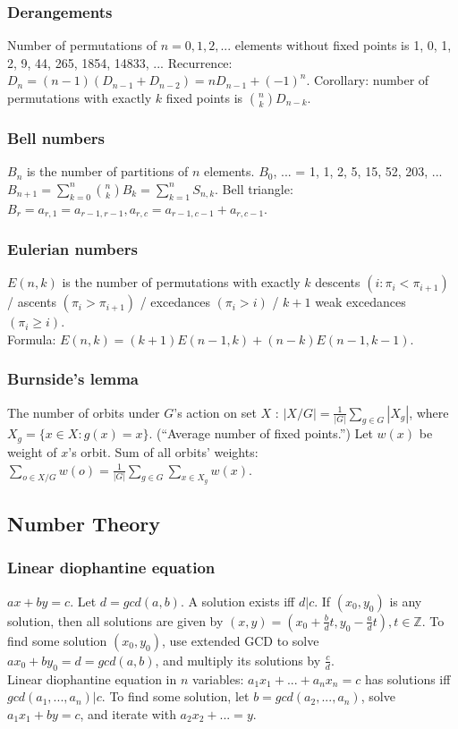 \documentclass[a4paper,12pt]{article}
\begin{document}
\subsubsection{Derangements}
Number of permutations of $n = 0,1,2,...$ elements without fixed points is 1, 0, 1, 2, 9, 44, 265, 1854, 14833, ... Recurrence: $D_{n} = (n-1)(D_{n-1} + D_{n-2}) = nD_{n-1} + (-1)^{n}$.
Corollary: number of permutations with exactly $k$ fixed points is $\binom{n}{k}D_{n-k}$.

\subsubsection{Bell numbers}
$B_{n}$ is the number of partitions of $n$ elements. $B_0$, ... = 1, 1, 2, 5, 15, 52, 203, ...\\
$B_{n+1} = \sum_{k=0}^{n}\binom{n}{k}B_{k} = \sum_{k=1}^{n} S_{n,k}$. Bell triangle: $B_r = a_{r,1} = a_{r-1,r-1}, a_{r,c} = a_{r-1,c-1} + a_{r,c-1}$.

\subsubsection{Eulerian numbers}
$E(n, k)$ is the number of permutations with exactly $k$ descents $(i : \pi_{i} < \pi_{i+1})$ / ascents $(\pi_{i} > \pi_{i+1})$ / excedances $(\pi_{i} > i)$ / $k + 1$ weak excedances $(\pi_{i} \geq i)$.\\
Formula: $E(n,k) = (k+1)E(n-1,k) + (n-k)E(n-1,k-1)$.

\subsubsection{Burnside's lemma}
The number of orbits under $G$'s action on set $X$ : $|X/G| = \frac{1}{|G|} \sum_{g \in G} |X_g|$, where $X_g = \{x \in X : g(x) = x\}$. (``Average number of fixed points.'')
Let $w(x)$ be weight of $x$'s orbit. Sum of all orbits' weights: $\sum_{o \in X/G}w(o) = \frac{1}{|G|} \sum_{g \in G} \sum_{x \in X_g} w(x)$.

\subsection{Number Theory}
\subsubsection{Linear diophantine equation}
$ax + by = c$. Let $d = gcd(a,b)$. A solution exists iff $d|c$. If $(x_0, y_0)$ is any solution, then all solutions are given by $(x, y) = (x_0 + \frac{b}{d}t, y_0 - \frac{a}{d}t), t \in \mathbb{Z}$. To find some solution $(x_0, y_0)$,
use extended GCD to solve $ax_0 + by_0 = d = gcd(a, b)$, and multiply its solutions by $\frac{c}{d}$.\\
Linear diophantine equation in $n$ variables: $a_1x_1 + ... + a_nx_n = c$ has solutions iff $gcd(a_1, ..., a_n) | c$. To find some solution, let $b = gcd(a_2, ..., a_n)$, solve $a_1x_1 + by = c$, and iterate with $a_2x_2 + ... = y$.
\end{document}
